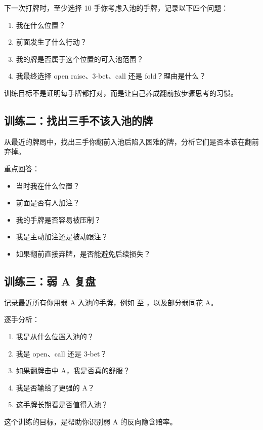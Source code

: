 下一次打牌时，至少选择 10 手你考虑入池的手牌，记录以下四个问题：

\begin{enumerate}
\item 我在什么位置？
\item 前面发生了什么行动？
\item 我的牌是否属于这个位置的可入池范围？
\item 我最终选择 open raise、3-bet、call 还是 fold？理由是什么？
\end{enumerate}

训练目标不是证明每手牌都打对，而是让自己养成翻前按步骤思考的习惯。

\subsection*{训练二：找出三手不该入池的牌}

从最近的牌局中，找出三手你翻前入池后陷入困难的牌，分析它们是否本该在翻前弃掉。

重点回答：

\begin{itemize}
\item 当时我在什么位置？
\item 前面是否有人加注？
\item 我的手牌是否容易被压制？
\item 我是主动加注还是被动跟注？
\item 如果翻前直接弃牌，是否能避免后续损失？
\end{itemize}

\subsection*{训练三：弱 A 复盘}

记录最近所有你用弱 A 入池的手牌，例如  至 ，以及部分弱同花 A。

逐手分析：

\begin{enumerate}
\item 我是从什么位置入池的？
\item 我是 open、call 还是 3-bet？
\item 如果翻牌击中 A，我是否真的舒服？
\item 我是否输给了更强的 A？
\item 这手牌长期看是否值得入池？
\end{enumerate}

这个训练的目标，是帮助你识别弱 A 的反向隐含赔率。


